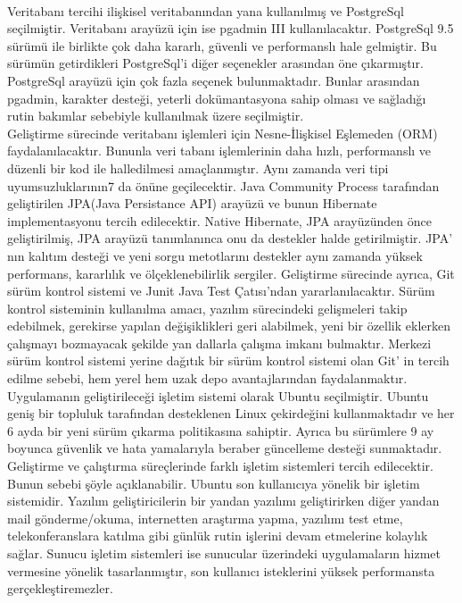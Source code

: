 \\
Veritabanı tercihi ilişkisel veritabanından yana kullanılmış ve PostgreSql seçilmiştir.
Veritabanı arayüzü için ise pgadmin III kullanılacaktır. PostgreSql 9.5 sürümü ile
birlikte çok daha kararlı, güvenli ve performanslı hale gelmiştir\cite{postgres}. Bu sürümün
getirdikleri PostgreSql'i diğer seçenekler arasından öne çıkarmıştır. PostgreSql arayüzü
için çok fazla seçenek bulunmaktadır\cite{postgresGUI}. Bunlar arasından pgadmin, karakter desteği,
yeterli dokümantasyona sahip olması ve sağladığı rutin bakımlar sebebiyle kullanılmak
üzere seçilmiştir\cite{pgAdmin}.
\\
Geliştirme sürecinde veritabanı işlemleri için Nesne-İlişkisel Eşlemeden (ORM)
faydalanılacaktır. Bununla veri tabanı işlemlerinin daha hızlı, performanslı ve düzenli
bir kod ile halledilmesi amaçlanmıştır\cite{ormNedir}. Aynı zamanda veri tipi uyumsuzluklarının7
da önüne geçilecektir. Java Community Process tarafından geliştirilen\cite{jpa} JPA(Java
Persistance API) arayüzü ve bunun Hibernate implementasyonu tercih edilecektir.
Native Hibernate, JPA arayüzünden önce geliştirilmiş, JPA arayüzü tanımlanınca onu
da destekler halde getirilmiştir. JPA' nın kalıtım desteği ve yeni sorgu metotlarını
destekler aynı zamanda yüksek performans, kararlılık ve ölçeklenebilirlik sergiler\cite{hibernateOrm}.
Geliştirme sürecinde ayrıca, Git sürüm kontrol sistemi ve Junit Java Test Çatısı'ndan
yararlanılacaktır. Sürüm kontrol sisteminin kullanılma amacı, yazılım sürecindeki
gelişmeleri takip edebilmek, gerekirse yapılan değişiklikleri geri alabilmek, yeni bir
özellik eklerken çalışmayı bozmayacak şekilde yan dallarla çalışma imkanı bulmaktır.
Merkezi sürüm kontrol sistemi yerine dağıtık bir sürüm kontrol sistemi olan Git' in
tercih edilme sebebi, hem yerel hem uzak depo avantajlarından faydalanmaktır\cite{git}.
Uygulamanın geliştirileceği işletim sistemi olarak Ubuntu seçilmiştir. Ubuntu geniş bir
topluluk tarafından desteklenen Linux çekirdeğini kullanmaktadır ve her 6 ayda bir yeni
sürüm çıkarma politikasına sahiptir. Ayrıca bu sürümlere 9 ay boyunca güvenlik ve hata
yamalarıyla beraber güncelleme desteği sunmaktadır\cite{ubuntuSurum}.
Geliştirme ve çalıştırma süreçlerinde farklı işletim sistemleri tercih edilecektir. Bunun
sebebi şöyle açıklanabilir. Ubuntu son kullanıcıya yönelik bir işletim sistemidir.
Yazılım geliştiricilerin bir yandan yazılımı geliştirirken diğer yandan mail
gönderme/okuma, internetten araştırma yapma, yazılımı test etme, telekonferanslara
katılma gibi günlük rutin işlerini devam etmelerine kolaylık sağlar. Sunucu işletim
sistemleri ise sunucular üzerindeki uygulamaların hizmet vermesine yönelik
tasarlanmıştır, son kullanıcı isteklerini yüksek performansta gerçekleştiremezler.


